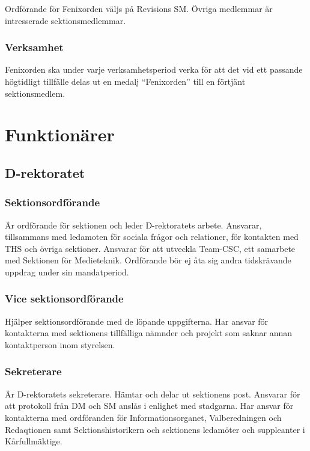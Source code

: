 \documentclass{dgovdoc}
\begin{document}
Ordförande för Fenixorden väljs på Revisions SM. Övriga medlemmar är intresserade sektionsmedlemmar.

\subsubsection{Verksamhet}

Fenixorden ska under varje verksamhetsperiod verka för att det vid ett passande högtidligt tillfälle delas ut en medalj ``Fenixorden'' till en förtjänt sektionsmedlem.

\section{Funktionärer}

\subsection{D-rektoratet}

\subsubsection{Sektionsordförande}

Är ordförande för sektionen och leder D-rektoratets arbete. Ansvarar, tillsammans med ledamoten för sociala frågor och relationer, för kontakten med THS och övriga sektioner. Ansvarar för att utveckla Team-CSC, ett samarbete med Sektionen för Medieteknik. Ordförande bör ej åta sig andra tidskrävande uppdrag under sin mandatperiod.

\subsubsection{Vice sektionsordförande}

Hjälper sektionsordförande med de löpande uppgifterna. Har ansvar för kontakterna med sektionens tillfälliga nämnder och projekt som saknar annan kontaktperson inom styrelsen.

\subsubsection{Sekreterare}

Är D-rektoratets sekreterare. Hämtar och delar ut sektionens post. Ansvarar för att protokoll från DM och SM anslås i enlighet med stadgarna. Har ansvar för kontakterna med ordföranden för Informationsorganet, Valberedningen och Redaqtionen samt Sektionshistorikern och sektionens ledamöter och suppleanter i Kårfullmäktige.
\end{document}
